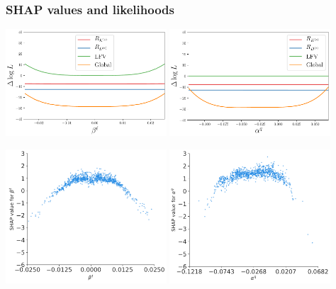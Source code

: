 \documentclass[mathserif, 10pt]{beamer}
\begin{document}
\begin{frame}
  \frametitle{SHAP values and likelihoods}

  \begin{center}
    \includegraphics[width=0.45\textwidth]{figures/evoplot_betal.pdf}
    \includegraphics[width=0.45\textwidth]{figures/evoplot_alphaq.pdf}   \end{center}
  \begin{center}
    \includegraphics[width=0.45\textwidth]{figures/SHAP_bl.pdf}
    \includegraphics[width=0.45\textwidth]{figures/SHAP_aq.pdf}
  \end{center}

\end{frame}
\end{document}
